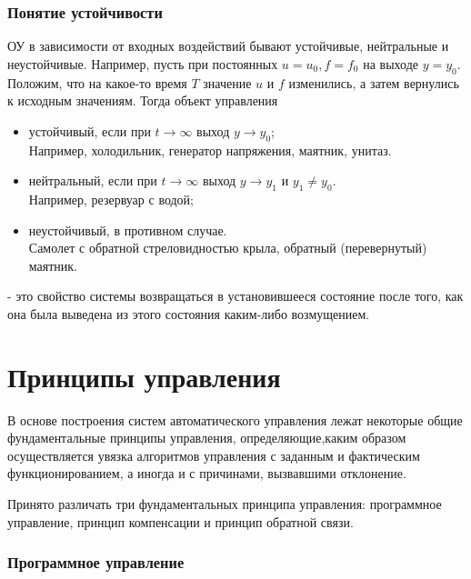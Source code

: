 \documentclass[../../TAU.tex]{subfiles}
\begin{document}
\pagebreak

\subsubsection{Понятие устойчивости}

    ОУ в зависимости от входных воздействий бывают устойчивые, нейтральные и неустойчивые. Например, пусть при постоянных $u = u_0, f = f_0$ на выходе $y = y_0$. Положим, что на какое-то время $T$ значение $u$ и $f$ изменились, а затем вернулись к исходным значениям. Тогда объект управления

    \begin{itemize}
        \item устойчивый, если при $t \rightarrow \infty$ выход $y \rightarrow y_0$; \\
    Например, холодильник, генератор напряжения, маятник, унитаз.
        \item нейтральный, если при $t \rightarrow \infty$ выход $y \rightarrow y_1$ и $y_1\neq y_0$. \\
    Например, резервуар с водой;
        \item неустойчивый, в противном случае.\\
    Самолет с обратной стреловидностью крыла, обратный (перевернутый) маятник.
    \end{itemize}

     - это свойство системы возвращаться в установившееся состояние после того, как она была выведена из этого состояния каким-либо возмущением.

\section{Принципы управления}
    
    В основе построения систем автоматического управления лежат некоторые общие фундаментальные принципы управления, определяющие,каким образом осуществляется увязка алгоритмов управления с заданным и фактическим функционированием, а иногда и с причинами, вызвавшими отклонение.\par
    Принято различать три фундаментальных принципа управления: программное управление, принцип компенсации и принцип обратной связи.

\subsubsection{Программное управление}
\end{document}
